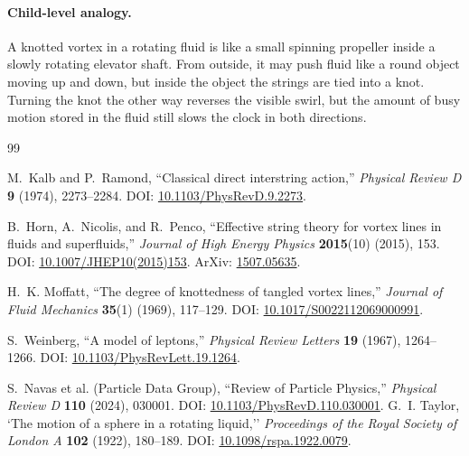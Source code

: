 \paragraph{Child-level analogy.}
A knotted vortex in a rotating fluid is like a small spinning propeller inside a
slowly rotating elevator shaft.  From outside, it may push fluid like a round
object moving up and down, but inside the object the strings are tied into a
knot.  Turning the knot the other way reverses the visible swirl, but the amount
of busy motion stored in the fluid still slows the clock in both directions.


\ifresearchtrackincluded\else
\begin{thebibliography}{99}


M.~Kalb and P.~Ramond,
``Classical direct interstring action,''
\emph{Physical Review D} \textbf{9} (1974), 2273--2284.
DOI: \href{https://doi.org/10.1103/PhysRevD.9.2273}{10.1103/PhysRevD.9.2273}.

B.~Horn, A.~Nicolis, and R.~Penco,
``Effective string theory for vortex lines in fluids and superfluids,''
\emph{Journal of High Energy Physics} \textbf{2015}(10) (2015), 153.
DOI: \href{https://doi.org/10.1007/JHEP10(2015)153}{10.1007/JHEP10(2015)153}.
ArXiv: \href{https://arxiv.org/abs/1507.05635}{1507.05635}.

H.~K. Moffatt,
``The degree of knottedness of tangled vortex lines,''
\emph{Journal of Fluid Mechanics} \textbf{35}(1) (1969), 117--129.
DOI: \href{https://doi.org/10.1017/S0022112069000991}{10.1017/S0022112069000991}.

S.~Weinberg,
``A model of leptons,''
\emph{Physical Review Letters} \textbf{19} (1967), 1264--1266.
DOI: \href{https://doi.org/10.1103/PhysRevLett.19.1264}{10.1103/PhysRevLett.19.1264}.

S.~Navas et al. (Particle Data Group),
``Review of Particle Physics,''
\emph{Physical Review D} \textbf{110} (2024), 030001.
DOI: \href{https://doi.org/10.1103/PhysRevD.110.030001}{10.1103/PhysRevD.110.030001}.
G.~I. Taylor,
`The motion of a sphere in a rotating liquid,''
\emph{Proceedings of the Royal Society of London A} \textbf{102} (1922), 180--189.
DOI: \href{https://doi.org/10.1098/rspa.1922.0079}{10.1098/rspa.1922.0079}.


\end{thebibliography}
